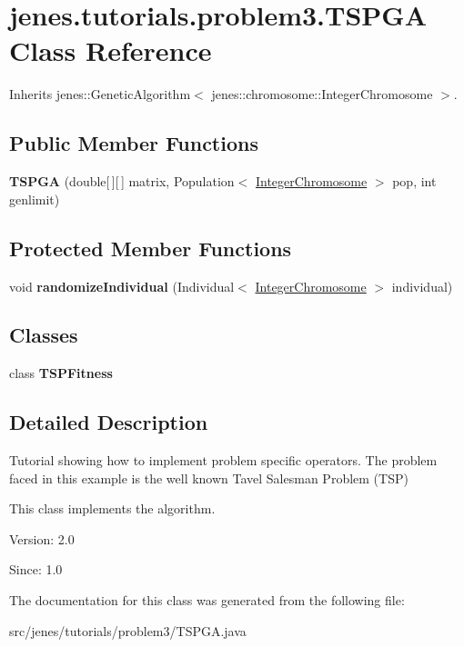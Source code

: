 \hypertarget{classjenes_1_1tutorials_1_1problem3_1_1_t_s_p_g_a}{
\section{jenes.tutorials.problem3.TSPGA Class Reference}
\label{classjenes_1_1tutorials_1_1problem3_1_1_t_s_p_g_a}
}
Inherits jenes::GeneticAlgorithm$<$ jenes::chromosome::IntegerChromosome $>$.

\subsection*{Public Member Functions}
\begin{CompactItemize}
\item 
\hypertarget{classjenes_1_1tutorials_1_1problem3_1_1_t_s_p_g_a_af0ea88647e26b0bea26bcccee20085a}{
\textbf{TSPGA} (double\mbox{[}$\,$\mbox{]}\mbox{[}$\,$\mbox{]} matrix, Population$<$ \hyperlink{classjenes_1_1chromosome_1_1_integer_chromosome}{IntegerChromosome} $>$ pop, int genlimit)}
\label{classjenes_1_1tutorials_1_1problem3_1_1_t_s_p_g_a_af0ea88647e26b0bea26bcccee20085a}

\end{CompactItemize}
\subsection*{Protected Member Functions}
\begin{CompactItemize}
\item 
\hypertarget{classjenes_1_1tutorials_1_1problem3_1_1_t_s_p_g_a_50dfde1c534b9dc5f8df16d4e7512eea}{
void \textbf{randomizeIndividual} (Individual$<$ \hyperlink{classjenes_1_1chromosome_1_1_integer_chromosome}{IntegerChromosome} $>$ individual)}
\label{classjenes_1_1tutorials_1_1problem3_1_1_t_s_p_g_a_50dfde1c534b9dc5f8df16d4e7512eea}

\end{CompactItemize}
\subsection*{Classes}
\begin{CompactItemize}
\item 
class \textbf{TSPFitness}
\end{CompactItemize}


\subsection{Detailed Description}
Tutorial showing how to implement problem specific operators. The problem faced in this example is the well known Tavel Salesman Problem (TSP)

This class implements the algorithm.

\begin{Desc}
\item[Version:]2.0 \end{Desc}
\begin{Desc}
\item[Since:]1.0 \end{Desc}


The documentation for this class was generated from the following file:\begin{CompactItemize}
\item 
src/jenes/tutorials/problem3/TSPGA.java\end{CompactItemize}
